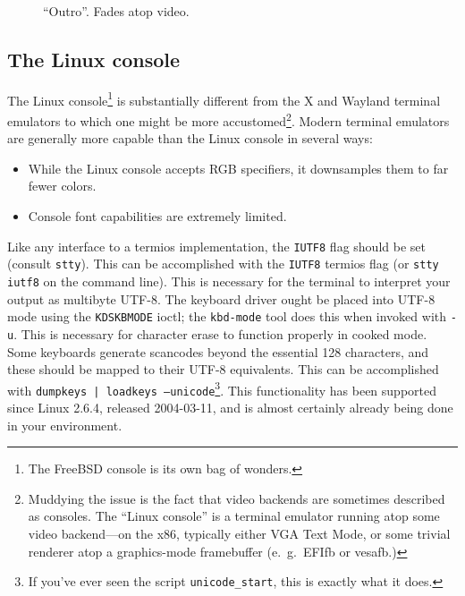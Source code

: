 \documentclass[letterpaper,10pt]{article}
\newenvironment{denseitemize}{
  \begin{itemize}
      \setlength{\itemsep}{0pt}
}{
  \end{itemize}
}
\begin{document}
\begin{figure}
\begin{minipage}{0.45\textwidth}
    \caption{``Outro''. Fades atop video.}
  \end{minipage}\hfill
\end{figure}

\clearpage
\newpage
\begin{appendices}


\pagebreak
\newpage


\pagebreak
\newpage


\section{The Linux console}
The Linux console\footnote{The FreeBSD console is its own bag of wonders.} is
substantially different from the X and Wayland terminal emulators to which one
might be more accustomed\footnote{Muddying the issue is the fact that video
backends are sometimes described as consoles. The ``Linux console'' is a terminal
emulator running atop some video backend---on the x86, typically either VGA
Text Mode, or some trivial renderer atop a graphics-mode framebuffer
(e.\ g.\ EFIfb or vesafb.)}. Modern terminal emulators are generally more capable
than the Linux console in several ways:

\begin{denseitemize}
\item{While the Linux console accepts RGB specifiers, it downsamples them to
    far fewer colors.}
\item{Console font capabilities are extremely limited.}
\end{denseitemize}

Like any interface to a termios\cite{termios} implementation, the \texttt{IUTF8}
flag should be set (consult \texttt{stty}). This can be accomplished with the
\texttt{IUTF8} termios flag (or \texttt{stty iutf8} on the command line). This
is necessary for the terminal to interpret your output as multibyte UTF-8. The
keyboard driver ought be placed into UTF-8 mode using the \texttt{KDSKBMODE}
ioctl; the \texttt{kbd-mode} tool does this when invoked with \texttt{-u}.
This is necessary for character erase to function properly in cooked mode. Some
keyboards generate scancodes beyond the essential 128 characters, and these
should be mapped to their UTF-8 equivalents. This can be accomplished with
\texttt{dumpkeys | loadkeys --unicode}\footnote{If you've ever seen the script
\texttt{unicode\_start}, this is exactly what it does.}. This functionality has
been supported since Linux 2.6.4, released 2004-03-11, and is almost certainly
already being done in your environment.


\end{appendices}
\end{document}
